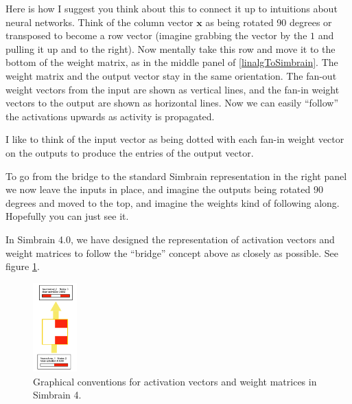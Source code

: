 Here is how I suggest you think about this to connect it up to intuitions about neural networks. Think of the column vector $\mathbf{x}$ as being rotated 90 degrees or transposed to become a row vector (imagine grabbing the vector by the $1$ and pulling it up and to the right). Now mentally take this row and move it to the bottom of the weight matrix, as in the middle panel of  \ref{linalgToSimbrain}. The weight matrix and the output vector stay in the same orientation. The fan-out weight vectors from the input are shown as vertical lines, and the fan-in weight vectors to the output are shown as horizontal lines. Now we can easily ``follow'' the activations upwards as activity is propagated. 

I like to think of the input vector as being dotted with each fan-in weight vector on the outputs to produce the entries of the output vector.

To go from the bridge to the standard Simbrain representation in the right panel we now leave the inputs in place, and imagine the outputs being rotated 90 degrees and moved to the top, and imagine the weights kind of following along. Hopefully you can just see it. 

In Simbrain 4.0, we have designed the representation of activation vectors and weight matrices to follow the ``bridge'' concept above as closely as possible. See figure \ref{simbrain4_ff23}.

\begin{figure}[h]
\centering
\includegraphics[width=0.15\textwidth]{images/simbrain4_ff_2_3.png}
\caption[Jeff Yoshimi.]{Graphical conventions for activation vectors and weight matrices in Simbrain 4. }
\label{simbrain4_ff23}
\end{figure}
%
%
%

